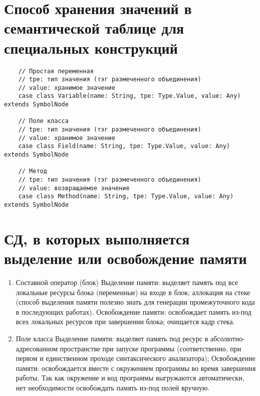 \documentclass[a4paper,12pt]{article}
\begin{document}
\section{Способ хранения значений в семантической таблице для специальных конструкций}
\begin{flushleft}
  \begin{verbatim}
    // Простая переменная
    // tpe: тип значения (тэг размеченного объединения)
    // value: хранимое значение
    case class Variable(name: String, tpe: Type.Value, value: Any) extends SymbolNode
    
    // Поле класса
    // tpe: тип значения (тэг размеченного объединения)
    // value: хранимое значение
    case class Field(name: String, tpe: Type.Value, value: Any) extends SymbolNode
    
    // Метод
    // tpe: тип значения (тэг размеченного объединения)
    // value: возвращаемое значение
    case class Method(name: String, tpe: Type.Value, value: Any) extends SymbolNode
  \end{verbatim}
\end{flushleft}
\newpage
\section{СД, в которых выполняется выделение или освобождение памяти}
\begin{flushleft}
  \justify
  \begin{enumerate}
    \item Составной оператор (блок)
    Выделение памяти: выделяет память под все локальные ресурсы блока (переменные) на входе в блок; аллокация на стеке (способ выделения памяти полезно знать для генерации промежуточного кода в последующих работах).
    Освобождение памяти: освобождает память из-под всех локальных ресурсов при завершении блока; очищается кадр стека.
    \item Поле класса
    Выделение памяти: выделяет память под ресурс в абсолютно-адресованном пространстве при запуске программы (соответственно, при первом и единственном проходе синтаксического анализатора);
    Освобождение памяти: освобождается вместе с окружением программы во время завершения работы. Так как окружение и код программы выгружаются автоматически, нет необходимости освобождать память из-под полей вручную.
  \end{enumerate}
\end{flushleft}
\newpage
\end{document}
